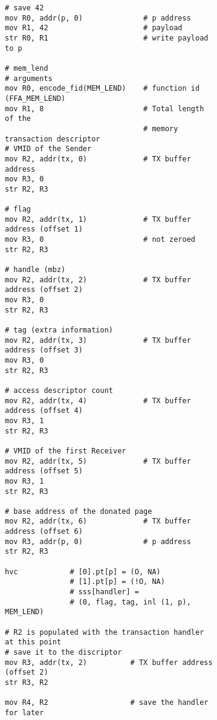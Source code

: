 \documentclass{book}
\begin{document}
\begin{figure}[hbt!]
\centering
\begin{subfigure}{.5\textwidth}
\centering
\begin{lstlisting}
# save 42
mov R0, addr(p, 0)              # p address
mov R1, 42                      # payload
str R0, R1                      # write payload to p

# mem_lend
# arguments
mov R0, encode_fid(MEM_LEND)    # function id (FFA_MEM_LEND)
mov R1, 8                       # Total length of the  
                                # memory transaction descriptor
# VMID of the Sender 
mov R2, addr(tx, 0)             # TX buffer address                               
mov R3, 0
str R2, R3

# flag
mov R2, addr(tx, 1)             # TX buffer address (offset 1)                               
mov R3, 0                       # not zeroed
str R2, R3

# handle (mbz)
mov R2, addr(tx, 2)             # TX buffer address (offset 2)
mov R3, 0
str R2, R3

# tag (extra information)
mov R2, addr(tx, 3)             # TX buffer address (offset 3)
mov R3, 0
str R2, R3

# access descriptor count
mov R2, addr(tx, 4)             # TX buffer address (offset 4)
mov R3, 1
str R2, R3

# VMID of the first Receiver
mov R2, addr(tx, 5)             # TX buffer address (offset 5)
mov R3, 1
str R2, R3

# base address of the donated page
mov R2, addr(tx, 6)             # TX buffer address (offset 6)
mov R3, addr(p, 0)              # p address
str R2, R3

hvc            # [0].pt[p] = (O, NA)
               # [1].pt[p] = (!O, NA)
               # sss[handler] = 
               # (0, flag, tag, inl (1, p), MEM_LEND)

# R2 is populated with the transaction handler at this point
# save it to the discriptor
mov R3, addr(tx, 2)          # TX buffer address (offset 2)
str R3, R2

mov R4, R2                   # save the handler for later

\end{lstlisting}
\label{fig:sub1}
\end{subfigure}%
\begin{subfigure}{.5\textwidth}
\centering
\begin{lstlisting}


\end{lstlisting}
\end{subfigure}
\end{figure}
\end{document}
